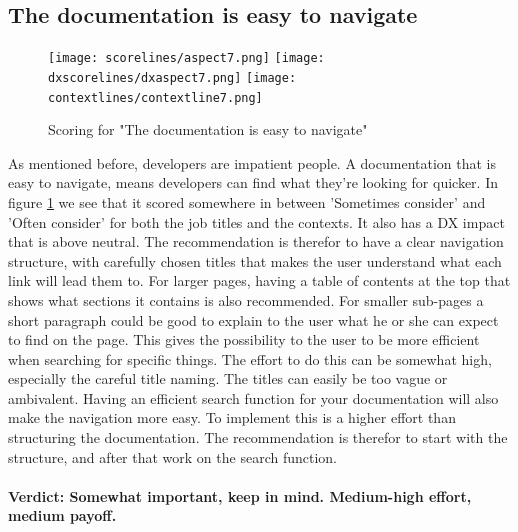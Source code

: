 \documentclass{cslthse-msc}
\begin{document}
    \subsection{The documentation is easy to navigate}
    \begin{figure}[H]
        \centering
        \texttt{[image: scorelines/aspect7.png]}
        \texttt{[image: dxscorelines/dxaspect7.png]}
        \texttt{[image: contextlines/contextline7.png]}
        \caption{Scoring for "The documentation is easy to navigate"}
        \label{fig:aspect7}
    \end{figure}
    As mentioned before, developers are impatient people. A documentation that is easy to navigate, means developers can find what they're looking for quicker. In figure \ref{fig:aspect7} we see that it scored somewhere in between 'Sometimes consider' and 'Often consider' for both the job titles and the contexts. It also has a DX impact that is above neutral. The recommendation is therefor to have a clear navigation structure, with carefully chosen titles that makes the user understand what each link will lead them to. For larger pages, having a table of contents at the top that shows what sections it contains is also recommended. For smaller sub-pages a short paragraph could be good to explain to the user what he or she can expect to find on the page. This gives the possibility to the user to be more efficient when searching for specific things. The effort to do this can be somewhat high, especially the careful title naming. The titles can easily be too vague or ambivalent. Having an efficient search function for your documentation will also make the navigation more easy. To implement this is a higher effort than structuring the documentation. The recommendation is therefor to start with the structure, and after that work on the search function. \\ \\
    \textbf{Verdict: Somewhat important, keep in mind. Medium-high effort, medium payoff.}
\end{document}
